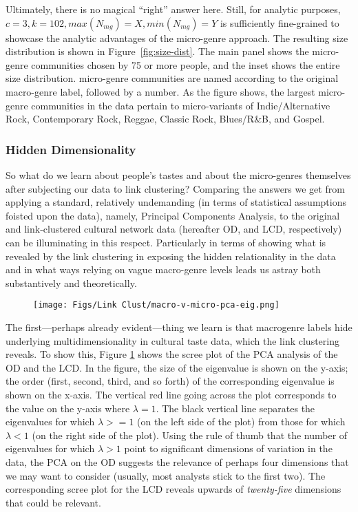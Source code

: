 Ultimately, there is no magical ``right'' answer here. Still, for analytic purposes, $c = 3, k = 102, max(N_{mg}) = X, min(N_{mg}) = Y$ is sufficiently fine-grained to showcase the analytic advantages of the micro-genre approach. The resulting size distribution is shown in Figure~\ref{fig:size-dist}. The main panel shows the micro-genre communities chosen by 75 or more people, and the inset shows the entire size distribution. micro-genre communities are named according to the original macro-genre label, followed by a number. As the figure shows, the largest micro-genre communities in the data pertain to micro-variants of Indie/Alternative Rock, Contemporary Rock, Reggae, Classic Rock, Blues/R\&B, and Gospel. 


\subsubsection{Hidden Dimensionality}
So what do we learn about people's tastes and about the micro-genres themselves after subjecting our data to link clustering? Comparing the answers we get from applying a standard, relatively undemanding (in terms of statistical assumptions foisted upon the data), namely, Principal Components Analysis, to the original and link-clustered cultural network data (hereafter OD, and LCD, respectively) can be illuminating in this respect. Particularly in terms of showing what is revealed by the link clustering in exposing the hidden relationality in the data and in what ways relying on vague macro-genre levels leads us astray both substantively and theoretically.

\begin{figure}[ht!]
    \texttt{[image: Figs/Link Clust/macro-v-micro-pca-eig.png]}
    \caption{}
    \label{fig:eig}
 \end{figure}

The first---perhaps already evident---thing we learn is that macrogenre labels hide underlying multidimensionality in cultural taste data, which the link clustering reveals. To show this, Figure \ref{fig:eig} shows the scree plot of the PCA analysis of the OD and the LCD. In the figure, the size of the eigenvalue is shown on the y-axis; the order (first, second, third, and so forth) of the corresponding eigenvalue is shown on the x-axis. The vertical red line going across the plot corresponds to the value on the y-axis where $\lambda = 1$. The black vertical line separates the eigenvalues for which $\lambda >= 1$ (on the left side of the plot) from those for which $\lambda < 1$ (on the right side of the plot). Using the rule of thumb that the number of eigenvalues for which $\lambda > 1$ point to significant dimensions of variation in the data, the PCA on the OD suggests the relevance of perhaps four dimensions that we may want to consider (usually, most analysts stick to the first two). The corresponding scree plot for the LCD reveals upwards of {\em twenty-five} dimensions that could be relevant. 

